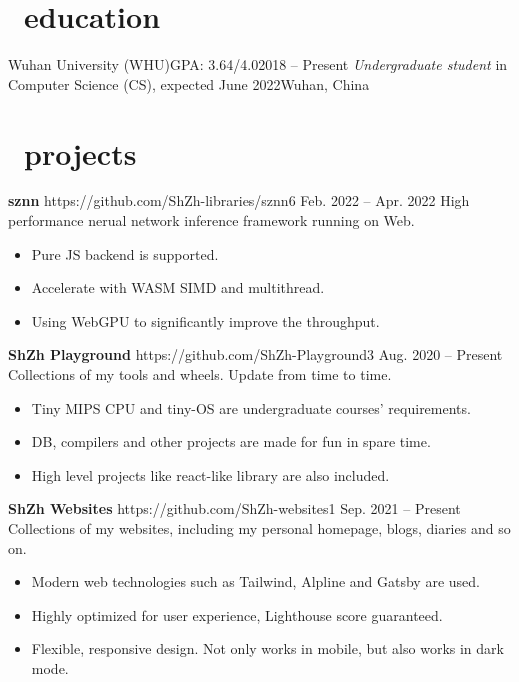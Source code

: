 \documentclass{common}
\begin{document}

\section{\faGraduationCap\ education}
\educationsubsection
    {Wuhan University (WHU)}{GPA: 3.64/4.0}{2018 -- Present}
    {\textit{Undergraduate student} in Computer Science (CS), expected June 2022}{Wuhan, China}

\section{\faCubes\ projects}
\projectsubsection
    {\textbf{sznn}}
    {https://github.com/ShZh-libraries/sznn}{6}
    {Feb. 2022 -- Apr. 2022}
High performance nerual network inference framework running on Web.
\begin{itemize}
    \item Pure JS backend is supported.
    \item Accelerate with WASM SIMD and multithread.
    \item Using WebGPU to significantly improve the throughput.
\end{itemize}
\projectsubsection
    {\textbf{ShZh Playground}}
    {https://github.com/ShZh-Playground}{3}
    {Aug. 2020 -- Present}
Collections of my tools and wheels. Update from time to time.
\begin{itemize}
    \item Tiny MIPS CPU and tiny-OS are undergraduate courses' requirements.
    \item DB, compilers and other projects are made for fun in spare time.
    \item High level projects like react-like library are also included.
\end{itemize}
\projectsubsection
    {\textbf{ShZh Websites}}
    {https://github.com/ShZh-websites}{1}
    {Sep. 2021 -- Present}
Collections of my websites, including my personal homepage, blogs, diaries and so on.
\begin{itemize}
    \item Modern web technologies such as Tailwind, Alpline and Gatsby are used.
    \item Highly optimized for user experience, Lighthouse score guaranteed.
    \item Flexible, responsive design. Not only works in mobile, but also works in dark mode.
\end{itemize}
\end{document}
